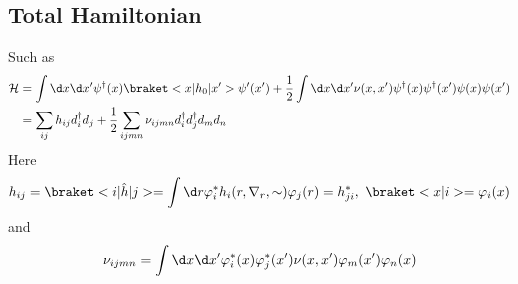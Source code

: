 \subsection{Total Hamiltonian}

Such as
\begin{align*}
  \mathcal H & = \int \d x \d x' \psi^\dagger(x)\braket<x|h_0|x'>\psi'(x')
              +\frac12\int \d x \d x' \nu(x,x')\psi^\dagger(x)\psi^\dagger(x')\psi(x)\psi(x')\\
             & = \sum_{ij}h_{ij}d_i^\dagger d_j + \frac12\sum_{ijmn}\nu_{ijmn}d_i^\dagger d_j^\dagger d_m d_n
\end{align*}
Here
\[h_{ij} = \braket<i|\hat h|j> = \int \d r \varphi_i^* h_i(r,\nabla_r,\sim)\varphi_j(r) = h^*_{ji}, ~ \braket<x|i> = \varphi_i(x)\]
and
\[
  \nu_{ijmn} = \int \d x\d x' \varphi_i^*(x)\varphi_j^*(x') \nu(x,x') \varphi_m(x')\varphi_n(x)
\]